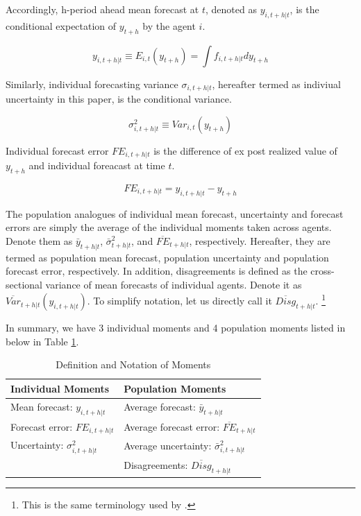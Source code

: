 \documentclass[]{article}
\begin{document}
Accordingly, h-period ahead mean forecast at $t$, denoted as $ y_{i,t+h|t}$, is the conditional expectation of $y_{t+h}$ by the agent $i$. 

$$y_{i,t+h|t} \equiv E_{i,t}(y_{t+h}) =\int f_{i, t+h|t} d y_{t+h}$$

Similarly, individual forecasting variance $\sigma_{i,t+h|t}$, hereafter termed as indiviual uncertainty in this paper, is the conditional variance.

$$\sigma^2_{i,t+h|t} \equiv Var_{i,t}( y_{t+h} )$$

Individual forecast error $FE_{i,t+h|t}$ is the difference of ex post realized value of $y_{t+h}$ and individual foreacast at time $t$. 

$$FE_{i,t+h|t} = y_{i,t+h|t} - y_{t+h}$$

The population analogues of individual mean forecast, uncertainty and forecast errors are simply the average of the individual moments taken across agents. Denote them as $\bar y_{t+h|t}$, $\bar \sigma^2_{t+h|t}$, and $\overline{FE}_{t+h|t}$, respectively. Hereafter, they are termed as population mean forecast, population uncertainty and population forecast error, respectively. In addition, disagreements is defined as the cross-sectional variance of mean forecasts of individual agents.  Denote it as $\overline{Var}_{t+h|t}(y_{i,t+h|t}) $. To simplify notation, let us directly call it $\overline{Disg}_{t+h|t}$.  \footnote{This is the same terminology used by \citet{xx}.}

In summary, we have 3 individual moments and 4 population moments listed in below in Table \ref{MomSum}.

\begin{table}[]
	\centering
		\caption{Definition and Notation of Moments}
		\label{MomSum}
	\begin{tabular}{ll}

		\hline 
		Individual Moments                                  & Population Moments                             \\
		\hline 
	Mean forecast: $y_{i,t+h|t}$                   & Average forecast: $\bar y_{t+h|t}$                   \\
		Forecast error: $FE_{i,t+h|t}$ & Average forecast error: $\overline{FE}_{t+h|t}$ \\
		Uncertainty: $\sigma^2_{i,t+h|t}$         & Average uncertainty:  $\bar \sigma^2_{i,t+h|t}$ \\
		& Disagreements:  $\overline{Disg}_{t+h|t}$       \\
		\hline 
	\end{tabular}
\end{table}
\end{document}
